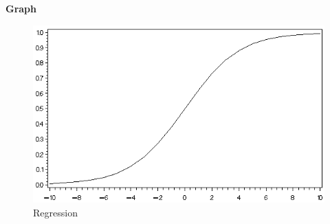 \documentclass[12pt]{article}
\begin{document}
\textbf {Graph\\}

\begin{figure}[ht]
\caption{Regression}
\includegraphics{graph.PNG}

\end{figure}
\end{document}
